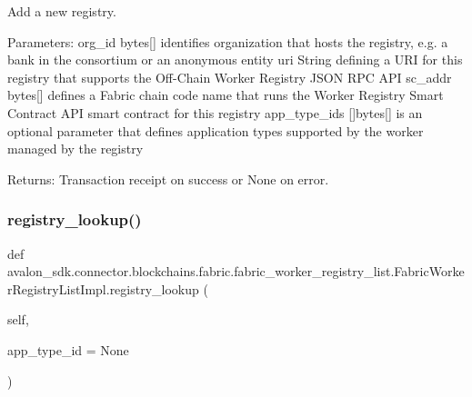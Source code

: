 \begin{DoxyVerb}Add a new registry.

Parameters:
org_id       bytes[] identifies organization that hosts the
     registry, e.g. a bank in the consortium or an
     anonymous entity
uri          String defining a URI for this registry that
     supports the Off-Chain Worker Registry
     JSON RPC API
sc_addr      bytes[] defines a Fabric chain code name that
     runs the Worker Registry Smart Contract API
     smart contract for this registry
app_type_ids []bytes[] is an optional parameter that defines
     application types supported by the worker
     managed by the registry

Returns:
Transaction receipt on success or None on error.
\end{DoxyVerb}
 \mbox{\label{classavalon__sdk_1_1connector_1_1blockchains_1_1fabric_1_1fabric__worker__registry__list_1_1FabricWorkerRegistryListImpl_abfe489588b14d03f94d7578a6fd978df}} 
\subsubsection{\texorpdfstring{registry\+\_\+lookup()}{registry\_lookup()}}
{\footnotesize\ttfamily def avalon\+\_\+sdk.\+connector.\+blockchains.\+fabric.\+fabric\+\_\+worker\+\_\+registry\+\_\+list.\+Fabric\+Worker\+Registry\+List\+Impl.\+registry\+\_\+lookup (\begin{DoxyParamCaption}\item[{}]{self,  }\item[{}]{app\+\_\+type\+\_\+id = {\ttfamily None} }\end{DoxyParamCaption})}

